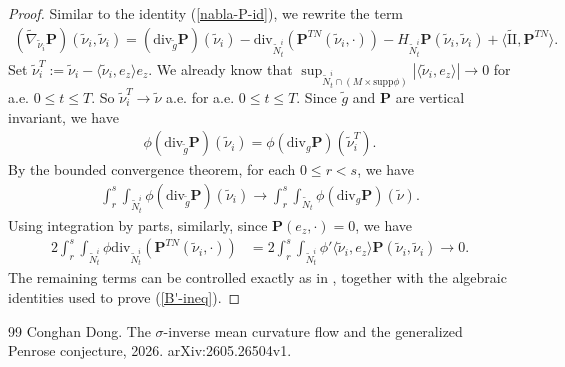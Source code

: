 \documentclass[10pt,a4paper]{amsart}
\begin{document}
\begin{proof}
Similar to the identity (\ref{nabla-P-id}), we rewrite the term
\begin{align*}
	 (\tilde{\nabla }_{\tilde{\nu }_i} \mathbf{P})(\tilde{\nu }_i, \tilde{\nu }_i) = (\mathrm{div}_{\tilde{g}} \mathbf{P})(\tilde{\nu }_i) - \mathrm{div}_{\tilde{N}^{i}_t}(\mathbf{P}^{TN}(\tilde{\nu }_i, \cdot ) ) - H_{\tilde{N}^{i}_{t}} \mathbf{P}(\tilde{\nu }_i, \tilde{\nu }_i) + \langle \tilde{\mathrm{II}}, \mathbf{P}^{TN} \rangle.
\end{align*} 
Set $\tilde{\nu }_i ^{T} := \tilde{\nu }_i - \langle \tilde{\nu }_i, e_{z} \rangle e_{z}$. We already know that $\sup_{\tilde{N}^{i}_t \cap (M \times \mathrm{supp} \phi )}|\langle \tilde{\nu }_i, e_{z} \rangle| \to 0$ for a.e. $0\leq t \leq T$. So $\tilde{\nu }_i ^{T} \to \tilde{\nu } $ a.e. for a.e. $0\leq t \leq T$. Since $\tilde{g}$ and $\mathbf{P}$ are vertical invariant, we have 
\begin{align*}
	\phi (\mathrm{div}_{\tilde{g}} \mathbf{P})(\tilde{\nu }_i) = \phi (\mathrm{div}_{g} \mathbf{P})(\tilde{\nu }_i ^{T}).
\end{align*} 
By the bounded convergence theorem, for each $0 \leq r <s$, we have
\begin{align*}
	\int_{r}^{s} \int_{\tilde{N}^{i}_{t}} \phi (\mathrm{div}_{\tilde{g}} \mathbf{P})(\tilde{\nu }_i) \to \int_{r}^{s} \int_{\tilde{N}_{t}}\phi (\mathrm{div}_{g} \mathbf{P})(\tilde{\nu }).
\end{align*} 
Using integration by parts, similarly, since $\mathbf{P}(e_{z}, \cdot )=0$, we have
\begin{align*}
	2 \int_{r}^{s}\int_{\tilde{N}^{i}_{t}} \phi \mathrm{div}_{\tilde{N}^{i}_{t}}(\mathbf{P}^{TN}(\tilde{\nu }_i, \cdot ) ) &= 2 \int_{r}^{s}\int_{\tilde{N}^{i}_{t}} \phi ' \langle \tilde{\nu }_i, e_{z} \rangle \mathbf{P}(\tilde{\nu }_{i}, \tilde{\nu }_i ) \to 0.
\end{align*} 
The remaining terms can be controlled exactly as in \cite[Section 6]{Dong26SigmaIMCF}, together with the algebraic identities used to prove (\ref{B'-ineq}). 
\end{proof}

\begin{thebibliography}{99}
 Conghan Dong. \newblock The {$\sigma$}-inverse mean curvature flow and the generalized {Penrose} conjecture, 2026. \newblock arXiv:2605.26504v1.
\end{thebibliography}
\end{document}
